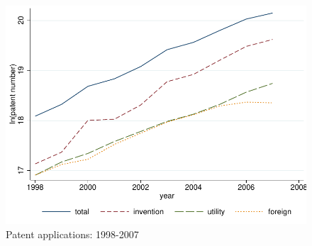 \documentclass[12pt]{article}%
\begin{document}
\begin{CJK*}{GBK}{fs}
\begin{figure}[p]
\includegraphics[width=\textwidth]{./figure/figure1.pdf}
\caption{\small Patent applications: 1998-2007}
\end{figure}
\clearpage




\end{CJK*}
\end{document}
